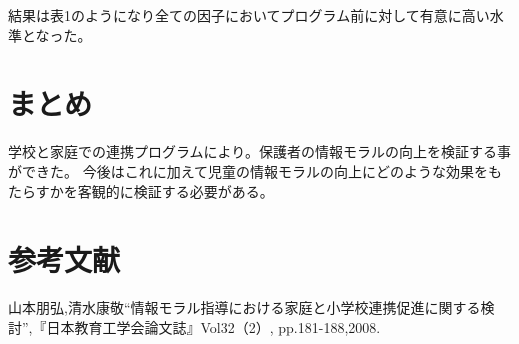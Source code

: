 \documentclass[a4j,11pt]{jsarticle}
\begin{document}
結果は表1のようになり全ての因子においてプログラム前に対して有意に高い水準となった。

\section{まとめ}
\label{sec:mokuteki}
学校と家庭での連携プログラムにより。保護者の情報モラルの向上を検証する事ができた。
今後はこれに加えて児童の情報モラルの向上にどのような効果をもたらすかを客観的に検証する必要がある。

\section{参考文献}
\label{sec:bunken}
山本朋弘,清水康敬“情報モラル指導における家庭と小学校連携促進に関する検討”,『日本教育工学会論文誌』Vol32（2）, pp.181-188,2008.
  
\end{document}
